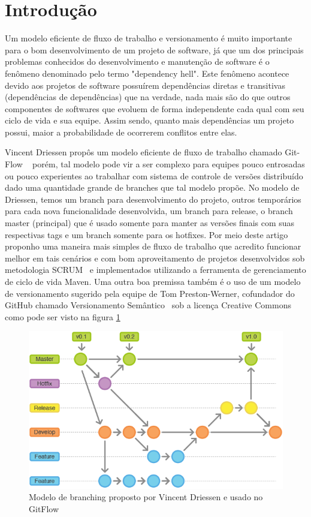 \section{Introdu{\c c}{\~a}o}
\label{sec:intro}
Um modelo eficiente de fluxo de trabalho e versionamento {\'e} muito importante para o bom desenvolvimento de um projeto de software, j{\'a} que um dos principais problemas conhecidos do desenvolvimento e manuten{\c c}{\~a}o de software {\'e} o fen{\^o}meno denominado pelo termo "dependency hell". Este fen{\^o}meno acontece devido aos projetos de software possu{\'i}rem depend{\^e}ncias diretas e transitivas (depend{\^e}ncias de depend{\^e}ncias) que na verdade, nada mais s{\~a}o do que outros componentes de softwares que evoluem de forma independente cada qual com seu ciclo de vida e sua equipe. Assim sendo, quanto mais depend{\^e}ncias um projeto possui, maior a probabilidade de ocorrerem conflitos entre elas.

Vincent Driessen prop{\^o}s um modelo eficiente de fluxo de trabalho chamado Git-Flow ~\cite{gitflow} por{\'e}m, tal modelo pode vir a ser complexo para equipes pouco entrosadas ou pouco experientes ao trabalhar com sistema de controle de vers{\~o}es distribu{\'i}do dado uma quantidade grande de branches que tal modelo prop{\~o}e. No modelo de Driessen, temos um branch para desenvolvimento do projeto, outros tempor{\'a}rios para cada nova funcionalidade desenvolvida, um branch para release, o branch master (principal) que {\'e} usado somente para manter as vers{\~o}es finais com suas respectivas tags e um branch somente para os hotfixes.
Por meio deste artigo proponho uma maneira mais simples de fluxo de trabalho que acredito funcionar melhor em tais cen{\'a}rios e com bom aproveitamento de projetos desenvolvidos sob metodologia SCRUM~\cite{scrum} e implementados utilizando a ferramenta de gerenciamento de ciclo de vida Maven. Uma outra boa premissa tamb{\'e}m {\'e} o uso de um modelo de versionamento sugerido pela equipe de Tom Preston-Werner, cofundador do GitHub chamado Versionamento Sem{\^a}ntico~\cite{semver} sob a licen{\c c}a Creative Commons como pode ser visto na figura \ref{fig:modelogitflow}

\begin{figure}[h!]
\centering
\includegraphics[width=0.7\linewidth]{img/modelo_gitflow}
\caption[Modelo de Branching GitFlow]{Modelo de branching proposto por Vincent Driessen e usado no GitFlow}
\label{fig:modelogitflow}
\end{figure}

